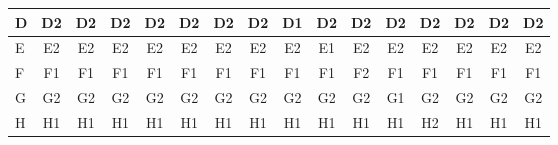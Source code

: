 \documentclass[twoside]{article}
\newenvironment{answer}{}{\medskip}
\begin{document}
\begin{answer}
\begin{table}[h]
\begin{latin}
\begin{tabular}{l|c|c|c|c|c|c|c|c|c|c|c|c|c|c|c|}
\multicolumn{1}{|l|}{D} & D2                                 & D2                                & D2                                & D2                                & D2                                & D2                                & D2                                & D1                                & D2                                & D2                                & D2                                 & D2                                 & D2                                 & D2                                 & D2                                 \\ \hline
\multicolumn{1}{|l|}{E} & E2                                 & E2                                & E2                                & E2                                & E2                                & E2                                & E2                                & E2                                & E1                                & E2                                & E2                                 & E2                                 & E2                                 & E2                                 & E2                                 \\ \hline
\multicolumn{1}{|l|}{F} & F1                                 & F1                                & F1                                & F1                                & F1                                & F1                                & F1                                & F1                                & F1                                & F2                                & F1                                 & F1                                 & F1                                 & F1                                 & F1                                 \\ \hline
\multicolumn{1}{|l|}{G} & G2                                 & G2                                & G2                                & G2                                & G2                                & G2                                & G2                                & G2                                & G2                                & G2                                & G1                                 & G2                                 & G2                                 & G2                                 & G2                                 \\ \hline
\multicolumn{1}{|l|}{H} & H1                                 & H1                                & H1                                & H1                                & H1                                & H1                                & H1                                & H1                                & H1                                & H1                                & H1                                 & H2                                 & H1                                 & H1                                 & H1                                 \\ \hline

\end{tabular}
\end{latin}
\end{table}
\end{answer}
\end{document}
